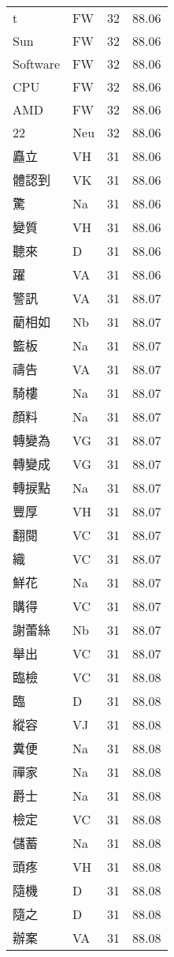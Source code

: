 \documentclass[twocolumn]{book}
\begin{document}
\begin{supertabular}{llrr}
t & FW & 32 &  88.06\\
Sun & FW & 32 &  88.06\\
Software & FW & 32 &  88.06\\
CPU & FW & 32 &  88.06\\
AMD & FW & 32 &  88.06\\
22 & Neu & 32 &  88.06\\
矗立 & VH & 31 &  88.06\\
體認到 & VK & 31 &  88.06\\
驚 & Na & 31 &  88.06\\
變質 & VH & 31 &  88.06\\
聽來 & D & 31 &  88.06\\
躍 & VA & 31 &  88.06\\
警訊 & VA & 31 &  88.07\\
藺相如 & Nb & 31 &  88.07\\
籃板 & Na & 31 &  88.07\\
禱告 & VA & 31 &  88.07\\
騎樓 & Na & 31 &  88.07\\
顏料 & Na & 31 &  88.07\\
轉變為 & VG & 31 &  88.07\\
轉變成 & VG & 31 &  88.07\\
轉捩點 & Na & 31 &  88.07\\
豐厚 & VH & 31 &  88.07\\
翻閱 & VC & 31 &  88.07\\
織 & VC & 31 &  88.07\\
鮮花 & Na & 31 &  88.07\\
購得 & VC & 31 &  88.07\\
謝蕾絲 & Nb & 31 &  88.07\\
舉出 & VC & 31 &  88.07\\
臨檢 & VC & 31 &  88.08\\
臨 & D & 31 &  88.08\\
縱容 & VJ & 31 &  88.08\\
糞便 & Na & 31 &  88.08\\
禪家 & Na & 31 &  88.08\\
爵士 & Na & 31 &  88.08\\
檢定 & VC & 31 &  88.08\\
儲蓄 & Na & 31 &  88.08\\
頭疼 & VH & 31 &  88.08\\
隨機 & D & 31 &  88.08\\
隨之 & D & 31 &  88.08\\
辦案 & VA & 31 &  88.08\\

\end{supertabular}
\end{document}

